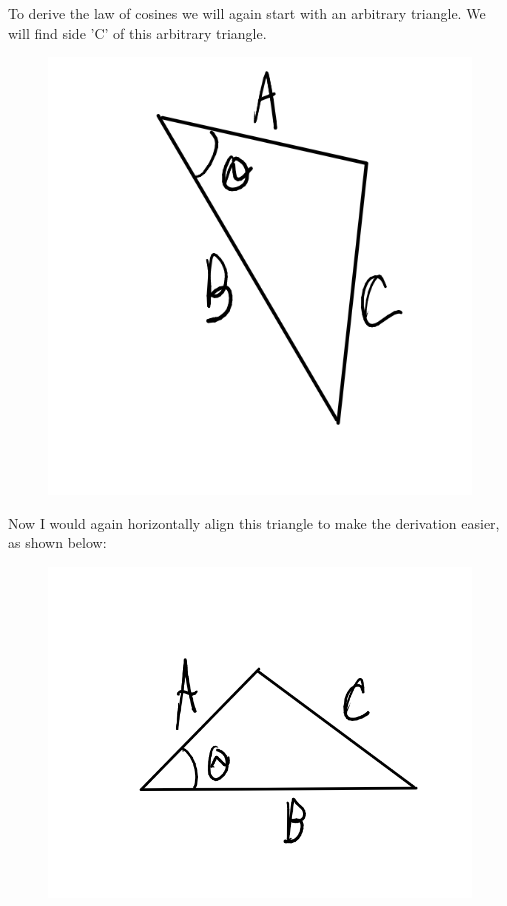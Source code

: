 \documentclass[12pt]{article}
\begin{document}
To derive the law of cosines we will again start with an arbitrary triangle. We will find side 'C' of this arbitrary triangle.
\begin{figure}[h]
\includegraphics[scale=0.25]{lawOfCosArb.png}
\end{figure}

Now I would again horizontally align this triangle to make the derivation easier, as shown below:
\begin{figure}[h]
\includegraphics[scale=0.25]{lawOfCosHorizontallyAligned.png}
\end{figure}
\end{document}
